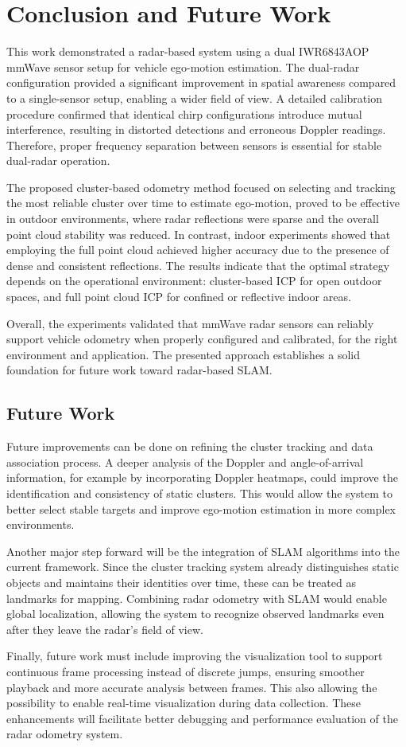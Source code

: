\newpage
\section{Conclusion and Future Work}
This work demonstrated a radar-based system using a dual IWR6843AOP mmWave sensor setup for vehicle ego-motion estimation.  
The dual-radar configuration provided a significant improvement in spatial awareness compared to a single-sensor setup, enabling a wider field of view.  
A detailed calibration procedure confirmed that identical chirp configurations introduce mutual interference, resulting in distorted detections and erroneous Doppler readings.  
Therefore, proper frequency separation between sensors is essential for stable dual-radar operation.

The proposed cluster-based odometry method focused on selecting and tracking the most reliable cluster over time to estimate ego-motion, proved to be effective in outdoor environments, where radar reflections were sparse and the overall point cloud stability was reduced.  
In contrast, indoor experiments showed that employing the full point cloud achieved higher accuracy due to the presence of dense and consistent reflections.  
The results indicate that the optimal strategy depends on the operational environment: cluster-based ICP for open outdoor spaces, and full point cloud ICP for confined or reflective indoor areas.

Overall, the experiments validated that mmWave radar sensors can reliably support vehicle odometry when properly configured and calibrated, for the right environment and application.
The presented approach establishes a solid foundation for future work toward radar-based SLAM.

\subsection{Future Work}

Future improvements can be done on refining the cluster tracking and data association process.  
A deeper analysis of the Doppler and angle-of-arrival information, for example by incorporating Doppler heatmaps, could improve the identification and consistency of static clusters.  
This would allow the system to better select stable targets and improve ego-motion estimation in more complex environments.

Another major step forward will be the integration of SLAM algorithms into the current framework.  
Since the cluster tracking system already distinguishes static objects and maintains their identities over time, these can be treated as landmarks for mapping.  
Combining radar odometry with SLAM would enable global localization, allowing the system to recognize observed landmarks even after they leave the radar’s field of view.  

Finally, future work must include improving the visualization tool to support continuous frame processing instead of discrete jumps, ensuring smoother playback and more accurate analysis between frames.
This also allowing the possibility to enable real-time visualization during data collection.  
These enhancements will facilitate better debugging and performance evaluation of the radar odometry system.